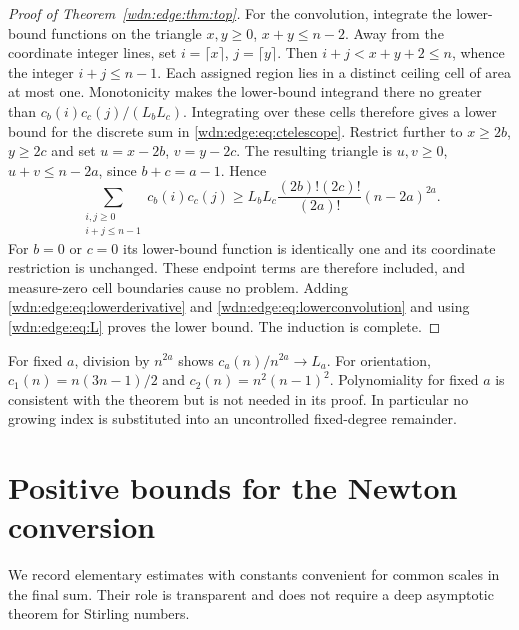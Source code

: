 \documentclass[11pt,letterpaper]{article}
\theoremstyle{remark}\newtheorem{remark}[theorem]{Remark}
\begin{document}
\begin{proof}[Proof of Theorem~\ref{wdn:edge:thm:top}]
For the convolution, integrate the lower-bound functions on the triangle
$x,y\ge0$, $x+y\le n-2$. Away from the coordinate integer lines, set
$i=\lceil x\rceil$, $j=\lceil y\rceil$. Then
$i+j<x+y+2\le n$, whence the integer $i+j\le n-1$.
Each assigned region lies in a distinct ceiling cell of area at most one.
Monotonicity makes the lower-bound integrand there no greater than
$c_b(i)c_c(j)/(L_bL_c)$. Integrating over these cells therefore gives a
lower bound for the discrete sum in \eqref{wdn:edge:eq:ctelescope}.
Restrict further to $x\ge2b$, $y\ge2c$ and set
$u=x-2b$, $v=y-2c$. The resulting triangle is
$u,v\ge0$, $u+v\le n-2a$, since $b+c=a-1$. Hence
\begin{equation}\label{wdn:edge:eq:lowerconvolution}
 \sum_{\substack{i,j\ge0\\i+j\le n-1}}c_b(i)c_c(j)
 \ge L_bL_c\frac{(2b)!(2c)!}{(2a)!}(n-2a)^{2a}.
\end{equation}
For $b=0$ or $c=0$ its lower-bound function is identically one and its
coordinate restriction is unchanged. These endpoint terms are therefore
included, and measure-zero cell boundaries cause no problem.
Adding \eqref{wdn:edge:eq:lowerderivative} and \eqref{wdn:edge:eq:lowerconvolution} and
using \eqref{wdn:edge:eq:L} proves the lower bound. The induction is complete.
\end{proof}

For fixed $a$, division by $n^{2a}$ shows
$c_a(n)/n^{2a}\to L_a$. For orientation,
$c_1(n)=n(3n-1)/2$ and $c_2(n)=n^2(n-1)^2$.
Polynomiality for fixed $a$ is consistent with the theorem but is not
needed in its proof. In particular no growing index is substituted into
an uncontrolled fixed-degree remainder.

\section{Positive bounds for the Newton conversion}\label{wdn:edge:sec:stirling}
We record elementary estimates with constants convenient for common
scales in the final sum. Their role is transparent and does not require
a deep asymptotic theorem for Stirling numbers.
\end{document}
